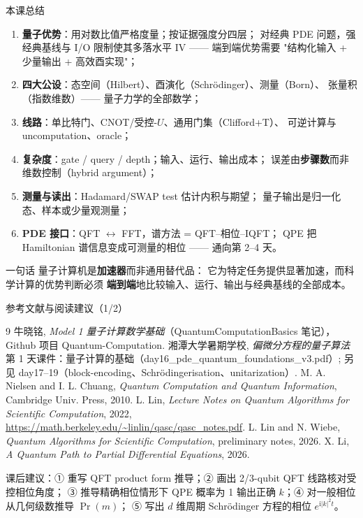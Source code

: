 \documentclass[aspectratio=169,10pt]{ctexbeamer}
\newcommand{\ii}{\mathrm{i}}
\begin{document}
\begin{frame}{本课总结}
\begin{enumerate}
\item \textbf{量子优势}：用对数比值严格度量；按证据强度分四层；
对经典 PDE 问题，强经典基线与 I/O 限制使其多落水平 IV —— 端到端优势需要
"结构化输入 + 少量输出 + 高效酉实现"；
\item \textbf{四大公设}：态空间（Hilbert）、酉演化（Schrödinger）、测量（Born）、
张量积（指数维数）—— 量子力学的全部数学；
\item \textbf{线路}：单比特门、CNOT/受控-$U$、通用门集（Clifford+T）、
可逆计算与 uncomputation、oracle；
\item \textbf{复杂度}：gate / query / depth；输入、运行、输出成本；
误差由\textbf{步骤数}而非维数控制（hybrid argument）；
\item \textbf{测量与读出}：Hadamard/SWAP test 估计内积与期望；
量子输出是归一化态、样本或少量观测量；
\item \textbf{PDE 接口}：QFT $\leftrightarrow$ FFT，谱方法 = QFT--相位--IQFT；
QPE 把 Hamiltonian 谱信息变成可测量的相位 —— 通向第 2--4 天。
\end{enumerate}
\begin{keybox}{一句话}
量子计算机是\textbf{加速器}而非通用替代品：
它为特定任务提供显著加速，而科学计算的优势判断必须
\textbf{端到端}地比较输入、运行、输出与经典基线的全部成本。
\end{keybox}
\end{frame}

\begin{frame}{参考文献与阅读建议（1/2）}
\scriptsize
\begin{thebibliography}{9}
 牛晓铭, \emph{Model 1 量子计算数学基础}（QuantumComputationBasics 笔记），Github 项目 Quantum-Computation.
 湘潭大学暑期学校, \emph{偏微分方程的量子算法} 第 1 天课件：量子计算的基础（day16\_pde\_quantum\_foundations\_v3.pdf）; 另见 day17--19（block-encoding、Schrödingerisation、unitarization）.
 M. A. Nielsen and I. L. Chuang, \emph{Quantum Computation and Quantum Information}, Cambridge Univ. Press, 2010.
 L. Lin, \emph{Lecture Notes on Quantum Algorithms for Scientific Computation}, 2022, \url{https://math.berkeley.edu/~linlin/qasc/qasc_notes.pdf}.
 L. Lin and N. Wiebe, \emph{Quantum Algorithms for Scientific Computation}, preliminary notes, 2026.
 X. Li, \emph{A Quantum Path to Partial Differential Equations}, 2026.
\end{thebibliography}
\vspace{1mm}
{\tiny\color{graytext}课后建议：① 重写 QFT product form 推导；② 画出 2/3-qubit QFT 线路核对受控相位角度；
③ 推导精确相位情形下 QPE 概率为 1 输出正确 $k$；④ 对一般相位从几何级数推导 $\Pr(m)$；
⑤ 写出 $d$ 维周期 Schrödinger 方程的相位 $e^{\ii|k|^2t}$。}
\end{frame}
\end{document}
